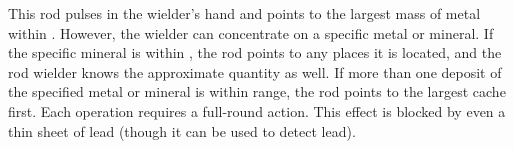 \begin{comment}
The following other functions of the rod also have no limit on the number of times they can be employed.
\begin{itemize*}
\item Climbing pole/ladder. When button 4 is pushed, a spike that can anchor in granite is extruded from the ball, while the other end sprouts three sharp hooks. The rod lengthens to anywhere between 5 and 50 feet in a single round, stopping when button 4 is pushed again. Horizontal bars three inches long fold out from the sides, 1 foot apart, in staggered progression. The rod is firmly held by the spike and hooks and can bear up to 4,000 pounds. The wielder can retract the pole by pushing button 5.
\item The ladder function can be used to force open doors. The wielder plants the rod's base 30 feet or less from the portal to be forced and in line with it, then pushes button 4. The force exerted has a Strength of \plus12.
\item When button 6 is pushed, the rod indicates magnetic north and gives the wielder a knowledge of his approximate depth beneath the surface or height above it.
\end{itemize*}

Strong enchantment, evocation, necromancy, and transmutation; CL 19th; Craft Rod, Craft Magic Arms and Armor, inflict light wounds, bull's strength, flame blade, hold person, fear; Price 70,000 gp.
\end{comment}

 This rod pulses in the wielder's hand and points to the largest mass of metal within . However, the wielder can concentrate on a specific metal or mineral. If the specific mineral is within , the rod points to any places it is located, and the rod wielder knows the approximate quantity as well. If more than one deposit of the specified metal or mineral is within range, the rod points to the largest cache first. Each operation requires a full-round action. This effect is blocked by even a thin sheet of lead (though it can be used to detect lead).


